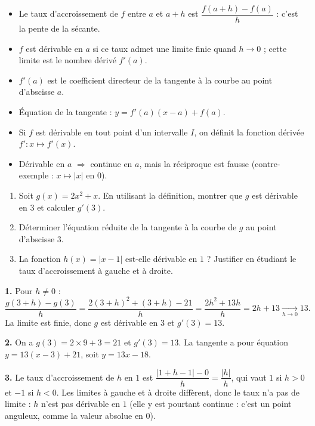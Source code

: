 \documentclass[11pt]{article}
\newcommand{\cle}[1]{{\popxbold\color{popdark}#1}}
\begin{document}
\begin{aretenir}
\begin{itemize}
\item Le \cle{taux d'accroissement} de $f$ entre $a$ et $a+h$ est $\dfrac{f(a+h)-f(a)}{h}$ : c'est la pente de la sécante.
\item $f$ est \cle{dérivable en $a$} si ce taux admet une limite finie quand $h \to 0$ ; cette limite est le nombre dérivé $f'(a)$.
\item $f'(a)$ est le \cle{coefficient directeur de la tangente} à la courbe au point d'abscisse $a$.
\item Équation de la tangente : $y = f'(a)(x - a) + f(a)$.
\item Si $f$ est dérivable en tout point d'un intervalle $I$, on définit la \cle{fonction dérivée} $f' : x \mapsto f'(x)$.
\item \cle{Dérivable en $a$} $\Rightarrow$ \cle{continue en $a$}, mais la réciproque est fausse (contre-exemple : $x \mapsto |x|$ en $0$).
\end{itemize}
\end{aretenir}

\begin{exercice}
\begin{enumerate}
\item Soit $g(x) = 2x^2 + x$. En utilisant la définition, montrer que $g$ est dérivable en $3$ et calculer $g'(3)$.
\item Déterminer l'équation réduite de la tangente à la courbe de $g$ au point d'abscisse $3$.
\item La fonction $h(x) = |x - 1|$ est-elle dérivable en $1$ ? Justifier en étudiant le taux d'accroissement à gauche et à droite.
\end{enumerate}
\end{exercice}

\begin{corrige}
\textbf{1.} Pour $h \neq 0$ :
\[ \frac{g(3+h) - g(3)}{h} = \frac{2(3+h)^2 + (3+h) - 21}{h} = \frac{2h^2 + 13h}{h} = 2h + 13 \xrightarrow[h \to 0]{} 13. \]
La limite est finie, donc $g$ est dérivable en $3$ et $g'(3) = 13$.

\textbf{2.} On a $g(3) = 2 \times 9 + 3 = 21$ et $g'(3) = 13$. La tangente a pour équation $y = 13(x - 3) + 21$, soit $y = 13x - 18$.

\textbf{3.} Le taux d'accroissement de $h$ en $1$ est $\dfrac{|1 + h - 1| - 0}{h} = \dfrac{|h|}{h}$, qui vaut $1$ si $h > 0$ et $-1$ si $h < 0$. Les limites à gauche et à droite diffèrent, donc le taux n'a pas de limite : $h$ n'est pas dérivable en $1$ (elle y est pourtant continue : c'est un point anguleux, comme la valeur absolue en $0$).
\end{corrige}
\end{document}
